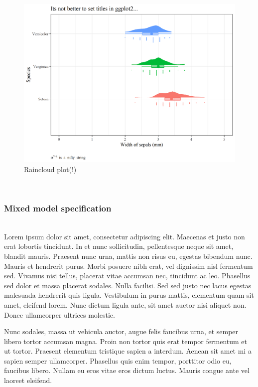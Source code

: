 \documentclass[]{elsarticle} %
\begin{document}
\(~\)\\

\begin{figure}[H]

{\centering \includegraphics[width=0.9\linewidth]{cookbook_files/figure-latex/raincloud_call-1} 

}

\caption{Raincloud plot(!)}\label{fig:raincloud_call}
\end{figure}

\(~\)\\

\hypertarget{mixed-model-specification}{%
\subsubsection{Mixed model
specification}\label{mixed-model-specification}}

\(~\)\\

Lorem ipsum dolor sit amet, consectetur adipiscing elit. Maecenas et
justo non erat lobortis tincidunt. In et nunc sollicitudin, pellentesque
neque sit amet, blandit mauris. Praesent nunc urna, mattis non risus eu,
egestas bibendum nunc. Mauris et hendrerit purus. Morbi posuere nibh
erat, vel dignissim nisl fermentum sed. Vivamus nisi tellus, placerat
vitae accumsan nec, tincidunt ac leo. Phasellus sed dolor et massa
placerat sodales. Nulla facilisi. Sed sed justo nec lacus egestas
malesuada hendrerit quis ligula. Vestibulum in purus mattis, elementum
quam sit amet, eleifend lorem. Nunc dictum ligula ante, sit amet auctor
nisi aliquet non. Donec ullamcorper ultrices molestie.

Nunc sodales, massa ut vehicula auctor, augue felis faucibus urna, et
semper libero tortor accumsan magna. Proin non tortor quis erat tempor
fermentum et ut tortor. Praesent elementum tristique sapien a interdum.
Aenean sit amet mi a sapien semper ullamcorper. Phasellus quis enim
tempor, porttitor odio eu, faucibus libero. Nullam eu eros vitae eros
dictum luctus. Mauris congue ante vel laoreet eleifend.
\end{document}
